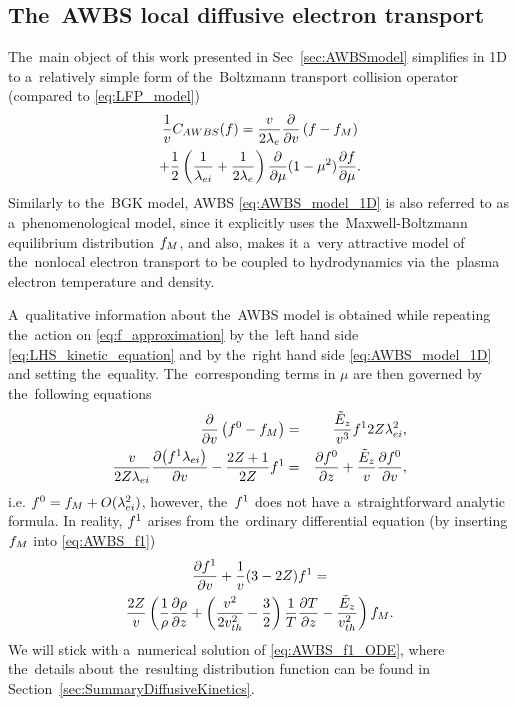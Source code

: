 \subsection{The~AWBS local diffusive electron transport}
\label{sec:AWBSDiffusiveRegime}
The~main object of this work presented in Sec~\ref{sec:AWBSmodel} simplifies
in 1D to a~relatively simple form of the~Boltzmann transport collision operator
(compared to \eqref{eq:LFP_model})
\begin{multline}
  \frac{1}{v}C_{AWBS}(f)
  = 
  \frac{v}{2\lambda_e} \frac{\partial{}}{\partial{v}}\left(f - f_M\right) \\
  + \frac{1}{2}\left(\frac{1}{\lambda_{ei}} + \frac{1}{2\lambda_e}\right)
  \frac{\partial{}}{\partial{\mu}}(1 - \mu^2)\frac{\partial{f}}{\partial{\mu}} .
  \label{eq:AWBS_model_1D}
\end{multline}
Similarly to the~BGK model, AWBS \ref{eq:AWBS_model_1D} 
is also referred to as a~phenomenological model, since it explicitly uses 
the~Maxwell-Boltzmann equilibrium distribution $f_M$, and also, 
makes it a~very attractive model of the~nonlocal electron
transport to be coupled to hydrodynamics via the~plasma electron temperature 
and density.

A~qualitative information about the~AWBS model is obtained while repeating
the~action on \eqref{eq:f_approximation} by the~left hand side 
\eqref{eq:LHS_kinetic_equation} and by the~right hand side 
\eqref{eq:AWBS_model_1D} and setting the~equality. The~corresponding terms
in $\mu$ are then governed by the~following equations
\begin{eqnarray}
  \frac{\partial{}}{\partial{v}}\left( f^0 -f_M\right) &=& 
  \frac{\tilde{E}_z}{v^3}f^1 2Z\lambda_{ei}^2 ,
  \label{eq:AWBS_f0} \\
  \frac{v}{2Z\lambda_{ei}}\frac{\partial{\left(f^1 \lambda_{ei}\right)}}{\partial{v}}  
  - \frac{2Z + 1}{2Z} f^1 &=&
  \frac{\partial{f^0}}{\partial{z}} + \frac{\tilde{E}_z}{v}\frac{\partial{f^0}}{\partial{v}} ,
  \label{eq:AWBS_f1} 
\end{eqnarray}
i.e. $f^0 = f_M + O(\lambda_{ei}^2)$, however, the~$f^1$ does not have 
a~straightforward analytic formula. In reality, $f^1$ arises from 
the~ordinary differential equation 
(by inserting $f_M$ into \eqref{eq:AWBS_f1})
\begin{multline}
  \frac{\partial{f^1}}{\partial{v}} + \frac{1}{v}(3-2Z)f^1
  = \\
  \frac{2Z}{v}\left(\frac{1}{\rho}\frac{\partial{\rho}}{\partial{z}} + 
  \left( \frac{v^2}{2 v_{th}^2} - \frac{3}{2}\right)
  \frac{1}{T}\frac{\partial{T}}{\partial{z}} - \frac{\tilde{E}_z}{v_{th}^2}\right)f_M .
  \label{eq:AWBS_f1_ODE}
\end{multline}
We will stick with a~numerical solution of \eqref{eq:AWBS_f1_ODE}, where
the~details about the~resulting distribution function can be found in 
Section~\ref{sec:SummaryDiffusiveKinetics}. 

